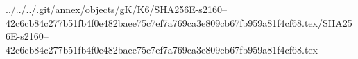 ../../../.git/annex/objects/gK/K6/SHA256E-s2160--42c6cb84c277b51fb4f0e482baee75c7ef7a769ca3e809cb67fb959a81f4cf68.tex/SHA256E-s2160--42c6cb84c277b51fb4f0e482baee75c7ef7a769ca3e809cb67fb959a81f4cf68.tex